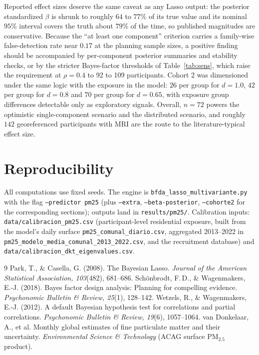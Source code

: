 \documentclass[11pt,a4paper]{article}
\newcommand{\pmf}{PM$_{2.5}$}
\begin{document}
Reported effect sizes deserve the same caveat as any Lasso output: the posterior standardized $\beta$ is shrunk to roughly $64$ to $77\%$ of its true value and its nominal $95\%$ interval covers the truth about $79\%$ of the time, so published magnitudes are conservative. Because the ``at least one component'' criterion carries a family-wise false-detection rate near $0.17$ at the planning sample sizes, a positive finding should be accompanied by per-component posterior summaries and stability checks, or by the stricter Bayes-factor thresholds of Table~\ref{tab:sens}, which raise the requirement at $\rho=0.4$ to 92 to 109 participants. Cohort 2 was dimensioned under the same logic with the exposure in the model: $26$ per group for $d=1.0$, $42$ per group for $d=0.8$ and $70$ per group for $d=0.65$, with exposure group differences detectable only as exploratory signals. Overall, $n=72$ powers the optimistic single-component scenario and the distributed scenario, and roughly $142$ georeferenced participants with MRI are the route to the literature-typical effect size.

\section{Reproducibility}

All computations use fixed seeds. The engine is \texttt{bfda\_lasso\_multivariante.py} with the flag \texttt{--predictor pm25} (plus \texttt{--extra}, \texttt{--beta-posterior}, \texttt{--cohorte2} for the corresponding sections); outputs land in \texttt{results/pm25/}. Calibration inputs: \texttt{data/calibracion\_pm25.csv} (participant-level residential exposure, built from the model's daily surface \texttt{pm25\_comunal\_diario.csv}, aggregated 2013--2022 in \texttt{pm25\_modelo\_media\_comunal\_2013\_2022.csv}, and the recruitment database) and \texttt{data/calibracion\_dkt\_eigenvalues.csv}.

\begin{thebibliography}{9}\small
{} Park, T., \& Casella, G. (2008). The Bayesian Lasso. \emph{Journal of the American Statistical Association, 103}(482), 681--686.
 Sch\"onbrodt, F.\,D., \& Wagenmakers, E.-J. (2018). Bayes factor design analysis: Planning for compelling evidence. \emph{Psychonomic Bulletin \& Review, 25}(1), 128--142.
 Wetzels, R., \& Wagenmakers, E.-J. (2012). A default Bayesian hypothesis test for correlations and partial correlations. \emph{Psychonomic Bulletin \& Review, 19}(6), 1057--1064.
 van Donkelaar, A., et al. Monthly global estimates of fine particulate matter and their uncertainty. \emph{Environmental Science \& Technology} (ACAG surface \pmf{} product).
\end{thebibliography}
\end{document}

